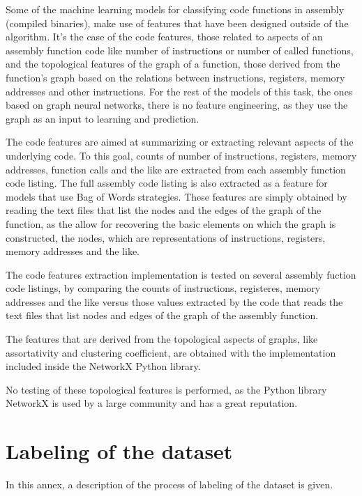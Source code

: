 \begin{appendices}
Some of the machine learning models for classifying code functions in assembly (compiled binaries), make use of features that have been designed outside of the algorithm. It's the case of the code features, those related to aspects of an assembly function code like number of instructions or number of called functions, and the topological features of the graph of a function, those derived from the function's graph based on the relations between instructions, registers, memory addresses and other instructions. 
For the rest of the models of this task, the ones based on graph neural networks, there is no feature engineering, as they use the graph as an input to learning and prediction.

The code features are aimed at summarizing or extracting relevant aspects of the underlying code. To this goal, counts of number of instructions, registers, memory addresses, function calls and the like are extracted from each assembly function code listing. The full assembly code listing is also extracted as a feature for models that use Bag of Words strategies. These features are simply obtained by reading the text files that list the nodes and the edges of the graph of the function, as the allow for recovering the basic elements on which the graph is constructed, the nodes, which are representations of instructions, registers, memory addresses and the like.


The code features extraction implementation is tested on several assembly fuction code listings, by comparing the counts of instructions, registeres, memory addresses and the like versus those values extracted by the code that reads the text files that list nodes and edges of the graph of the assembly function.


The features that are derived from the topological aspects of graphs, like assortativity and clustering coefficient, are obtained with the implementation included inside the NetworkX Python library.

No testing of these topological features is performed, as the Python library NetworkX is used by a large community and has a great reputation. 


\section{Labeling of the dataset}

In this annex, a description of the process of labeling of the dataset is given.


\end{appendices}
